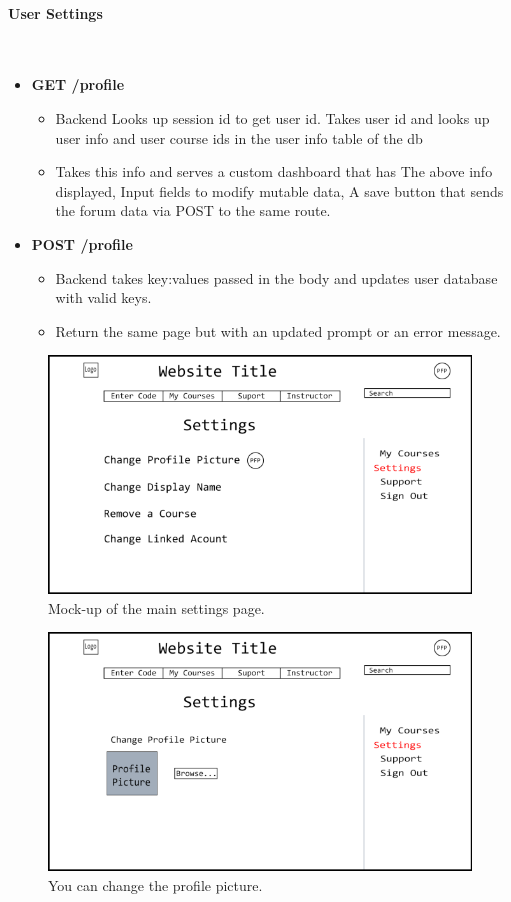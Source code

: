 \documentclass{article}
\begin{document}
\newpage

\paragraph{User Settings}\\
\begin{itemize}
    \item \textbf{GET /profile}
        \begin{itemize}
        \item Backend Looks up session id to get user id. Takes user id and looks up user info and user course ids in the user info table of the db
        \item Takes this info and serves a custom dashboard that has The above info displayed, Input fields to modify mutable data, A save button that sends the forum data via POST to the same route.
    \end{itemize}
\item \textbf{POST /profile}
    \begin{itemize}
        \item Backend takes key:values passed in the body and updates user database with valid keys.
        \item Return the same page but with an updated prompt or an error message.
    \end{itemize}
\end{itemize}
\begin{figure}[h]
    \caption{Mock-up of the main settings page.}
    \includegraphics[width=\textwidth]{user_settings_page}
\end{figure}
\begin{figure}[h]
    \caption{You can change the profile picture.}
    \includegraphics[width=\textwidth]{user_settings_page_pfp}
\end{figure}
\end{document}
